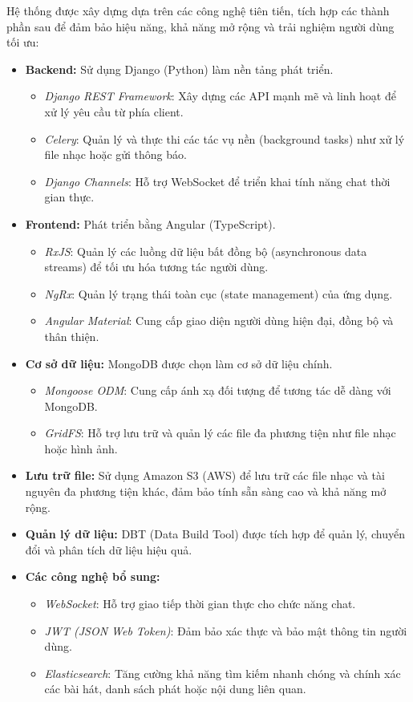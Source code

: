 \documentclass[a4paper,12pt]{report}
\begin{document}
Hệ thống được xây dựng dựa trên các công nghệ tiên tiến, tích hợp các thành phần sau để đảm bảo hiệu năng, khả năng mở rộng và trải nghiệm người dùng tối ưu:

\begin{itemize}
    \item \textbf{Backend:} Sử dụng Django (Python) làm nền tảng phát triển.
        \begin{itemize}
            \item \textit{Django REST Framework}: Xây dựng các API mạnh mẽ và linh hoạt để xử lý yêu cầu từ phía client.
            \item \textit{Celery}: Quản lý và thực thi các tác vụ nền (background tasks) như xử lý file nhạc hoặc gửi thông báo.
            \item \textit{Django Channels}: Hỗ trợ WebSocket để triển khai tính năng chat thời gian thực.
        \end{itemize}
    \item \textbf{Frontend:} Phát triển bằng Angular (TypeScript).
        \begin{itemize}
            \item \textit{RxJS}: Quản lý các luồng dữ liệu bất đồng bộ (asynchronous data streams) để tối ưu hóa tương tác người dùng.
            \item \textit{NgRx}: Quản lý trạng thái toàn cục (state management) của ứng dụng.
            \item \textit{Angular Material}: Cung cấp giao diện người dùng hiện đại, đồng bộ và thân thiện.
        \end{itemize}
    \item \textbf{Cơ sở dữ liệu:} MongoDB được chọn làm cơ sở dữ liệu chính.
        \begin{itemize}
            \item \textit{Mongoose ODM}: Cung cấp ánh xạ đối tượng để tương tác dễ dàng với MongoDB.
            \item \textit{GridFS}: Hỗ trợ lưu trữ và quản lý các file đa phương tiện như file nhạc hoặc hình ảnh.
        \end{itemize}
    \item \textbf{Lưu trữ file:} Sử dụng Amazon S3 (AWS) để lưu trữ các file nhạc và tài nguyên đa phương tiện khác, đảm bảo tính sẵn sàng cao và khả năng mở rộng.
    \item \textbf{Quản lý dữ liệu:} DBT (Data Build Tool) được tích hợp để quản lý, chuyển đổi và phân tích dữ liệu hiệu quả.
    \item \textbf{Các công nghệ bổ sung:}
        \begin{itemize}
            \item \textit{WebSocket}: Hỗ trợ giao tiếp thời gian thực cho chức năng chat.
            \item \textit{JWT (JSON Web Token)}: Đảm bảo xác thực và bảo mật thông tin người dùng.
            \item \textit{Elasticsearch}: Tăng cường khả năng tìm kiếm nhanh chóng và chính xác các bài hát, danh sách phát hoặc nội dung liên quan.
        \end{itemize}
\end{itemize}
\end{document}
